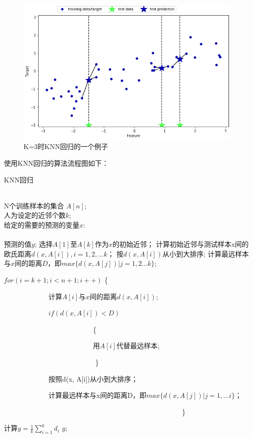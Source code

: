\begin{figure}[h]
	\centering
	\includegraphics[scale=0.5,angle=0]{images/1.png}
	\caption{K=3时KNN回归的一个例子}
	\label{1}
\end{figure}


使用KNN回归的算法流程图如下：


	\begin{algorithm}[h]
		\caption{KNN回归}
		\label{alg:Framwork}
		\begin{algorithmic}[1] %
			\REQUIRE ~~\\ %
			N个训练样本的集合  $A[n]$;\\
			人为设定的近邻个数$k$;\\
			给定的需要的预测的变量$x$:\\
			\ENSURE ~~\\ %
			预测的值$y$;
			\STATE 选择$A[1]$至$A[k]$作为$x$的初始近邻；
			\STATE 计算初始近邻与测试样本x间的欧氏距离$d(x, A[i]), i=1,2,...k$；
			\STATE 按$d(x, A[i])$从小到大排序;
			\STATE 计算最远样本与$x$间的距离$D$，即$max \{ d(x, A[j]) | j=1,2...k \} $;
			\STATE 
			
			 $for(i=k+1; i<n+1; i++)$ \{ 
			 
			 ~~~~~~~~~~~~~计算$A[i]$与$x$间的距离$d(x, A[i])$;
			  
			 ~~~~~~~~~~~~~$if (d(x, A[i]) < D )$
			 
			  ~~~~~~~~~~~~~~~~~~~~~~~~~~\{ 
			  
			  ~~~~~~~~~~~~~~~~~~~~~~~~~~用$A[i]$代替最远样本;  
			  
			  ~~~~~~~~~~~~~~~~~~~~~~~~~~ \}
			 
			 ~~~~~~~~~~~~~按照d(x, A[i])从小到大排序；
			 
			 ~~~~~~~~~~~~~计算最远样本与x间的距离D，即$max\{d(x, A[j]) | j=1,...i\}$；
			 
			 ~~~~~~~~~~~~~~~~~~~~~~~~~~~~~~~~~~~~~~~~~~~~~~~~~~~~\}
			
			\STATE 计算$y=\frac{1}{k} \sum_{i=1}^kd_i$
			\RETURN $y$; %
		\end{algorithmic}
	\end{algorithm}

